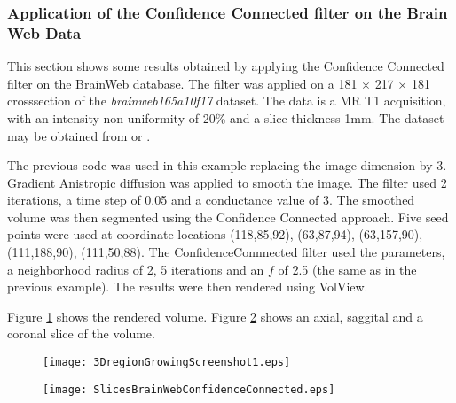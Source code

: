 \subsubsection{Application of the Confidence Connected filter on the Brain Web Data}
This section shows some results obtained by applying the Confidence Connected filter on the BrainWeb database. The filter was applied on a 181 $\times$ 217 $\times$ 181 crosssection of the {\it brainweb165a10f17} dataset. The data is a MR T1 acquisition, with an intensity non-uniformity of 20\% and a slice thickness 1mm. The dataset may be obtained from
 or
.

The previous code was used in this example replacing the image dimension by 3.
Gradient Anistropic diffusion was applied to smooth the image. The filter used 2 iterations, a time step of 0.05 and a conductance value of 3. The smoothed volume was then segmented using the Confidence Connected approach. Five seed points were used at coordinate locations (118,85,92), (63,87,94), (63,157,90), (111,188,90), (111,50,88). The ConfidenceConnnected filter used the parameters, a neighborhood radius of 2, 5 iterations and an $f$ of 2.5 (the same as in the previous example). The results were then rendered using VolView.

Figure \ref{fig:3DregionGrowingScreenshot1} shows the rendered volume. Figure \ref{fig:SlicesBrainWeb} shows an axial, saggital and a coronal slice of the volume.

\begin{figure}
\center
\texttt{[image: 3DregionGrowingScreenshot1.eps]}
\label{fig:3DregionGrowingScreenshot1}
\end{figure}

\begin{figure}
\center
\texttt{[image: SlicesBrainWebConfidenceConnected.eps]}
\label{fig:SlicesBrainWeb}
\end{figure}


